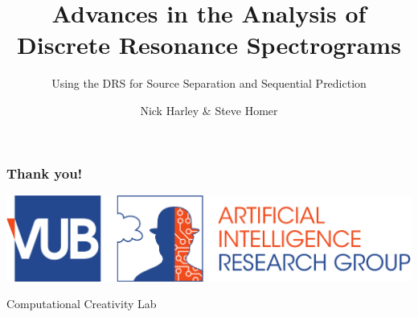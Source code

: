 \documentclass{beamer}
\begin{document}
\title{Advances in the Analysis of \\ Discrete Resonance Spectrograms}
\subtitle{Using the DRS for Source Separation and Sequential Prediction}
\author{Nick Harley \& Steve Homer}
\date{}
\frame{\titlepage}

%



\begin{frame}
  \frametitle{Thank you!}
  \includegraphics[width=\textwidth]{dept/vub-ai.pdf}
  \begin{center}
    \huge{Computational Creativity Lab}
  \end{center}
\end{frame}
\end{document}
